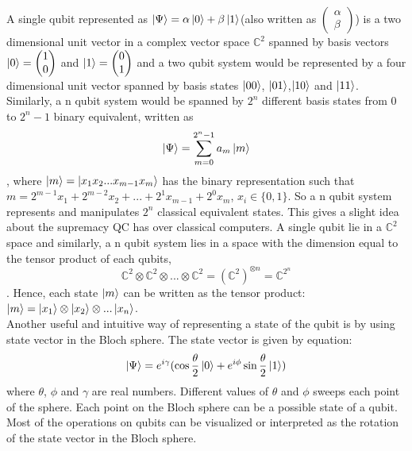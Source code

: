 A single qubit represented as $\ket{\Psi} = \alpha\ket{0} + \beta\ket{1}$(also written as $\begin{pmatrix}\alpha \\ \beta \end{pmatrix}$) is a two dimensional unit vector in a  complex vector space $\mathbb{C}^{2}$ spanned by basis vectors $\ket{0} = \begin{pmatrix} 1 \\ 0\end{pmatrix}$  and $\ket{1} = \begin{pmatrix} 0 \\ 1\end{pmatrix}$ and a two qubit system would be represented by a four dimensional unit vector spanned by basis states $\ket{00}$, $\ket{01}$,$\ket{10}$ and $\ket{11}$. Similarly, a n qubit system would be spanned by $2^{n}$ different basis states from 0 to $2^{n}-1$ binary equivalent, written as 
\begin{equation}
\ket{\Psi} = \sum_{m=0}^{2^{n}-1} a_{m}\ket{m}\label{eq:2.2}
\end{equation},
where $\ket{m} = \ket{x_{1}x_{2}...x_{m-1}x_{m}}$ has the binary representation such that $m = 2^{m-1}x_{1} + 2^{m-2}x_{2} + ... + 2^{1}x_{m-1} + 2^{0}x_{m}$,  $x_{i}\in \{0,1\}$. So a n qubit system represents and manipulates $2^{n}$ classical equivalent states.  This gives a slight idea about the supremacy \acrshort{QC} has over classical computers. A single qubit lie in a $\mathbb{C}^{2}$ space and similarly, a n qubit system lies in a space with the dimension equal to the tensor product of each qubits, \begin{equation} \mathbb{C}^{2} \otimes \mathbb{C}^{2} \otimes ... \otimes \mathbb{C}^{2} = ({\mathbb{C}^{2}})^{\otimes n} =  \mathbb{C}^{2^{n}} \end{equation}.\cite{Cheung} Hence, each state $\ket{m}$ can be written as the tensor product: $\ket{m}=\ket{x_1}\otimes\ket{x_2}\otimes...\ket{x_n}$.
\\
Another useful and intuitive way of representing a state of the qubit is by using state vector in the Bloch sphere. The state vector is given by equation: \begin{equation}
    \ket{\Psi}= e^{i\gamma}(\cos\frac{\theta}{2}\ket{0} + e^{i\phi}\sin\frac{\theta}{2}\ket{1})
    \label{eq: 2.4}
\end{equation}
where $\theta$, $\phi$ and $\gamma$ are real numbers. Different values of $\theta$ and $\phi$ sweeps each point of the sphere. Each point on the Bloch sphere can be a possible state of a qubit. Most of the operations on qubits can be visualized or interpreted as the rotation of the state vector in the Bloch sphere.

